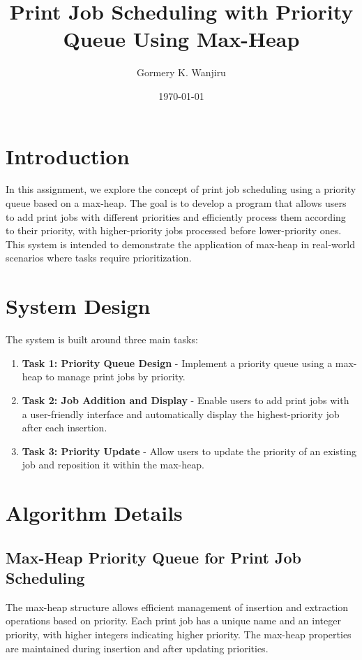 \documentclass{article}
\title{Print Job Scheduling with Priority Queue Using Max-Heap}
\author{Gormery K. Wanjiru}
\date{\today}
\begin{document}
\maketitle

\section{Introduction}
In this assignment, we explore the concept of print job scheduling using a priority queue based on a max-heap. The goal is to develop a program that allows users to add print jobs with different priorities and efficiently process them according to their priority, with higher-priority jobs processed before lower-priority ones. This system is intended to demonstrate the application of max-heap in real-world scenarios where tasks require prioritization.

\section{System Design}
The system is built around three main tasks:
\begin{enumerate}
    \item \textbf{Task 1: Priority Queue Design} - Implement a priority queue using a max-heap to manage print jobs by priority.
    \item \textbf{Task 2: Job Addition and Display} - Enable users to add print jobs with a user-friendly interface and automatically display the highest-priority job after each insertion.
    \item \textbf{Task 3: Priority Update} - Allow users to update the priority of an existing job and reposition it within the max-heap.
\end{enumerate}

\section{Algorithm Details}

\subsection{Max-Heap Priority Queue for Print Job Scheduling}
The max-heap structure allows efficient management of insertion and extraction operations based on priority. Each print job has a unique name and an integer priority, with higher integers indicating higher priority. The max-heap properties are maintained during insertion and after updating priorities.
\end{document}
